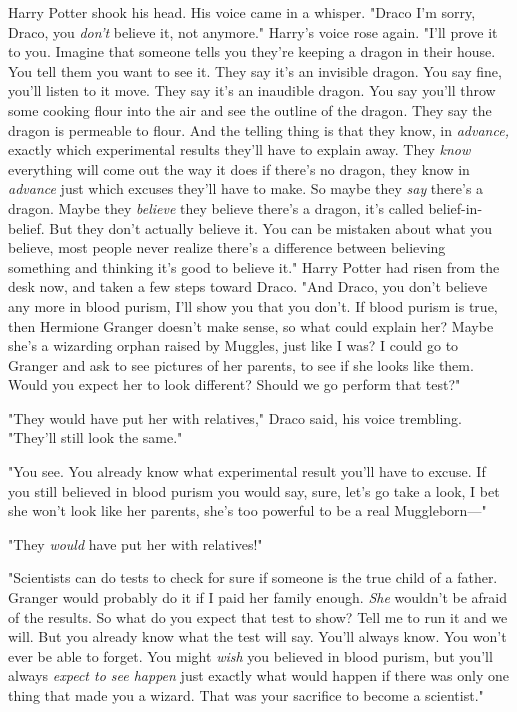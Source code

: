 Harry Potter shook his head. His voice came in a whisper. "Draco{\el} I'm
sorry, Draco, you \emph{don't} believe it, not anymore." Harry's voice rose
again. "I'll prove it to you. Imagine that someone tells you they're keeping a
dragon in their house. You tell them you want to see it. They say it's an
invisible dragon. You say fine, you'll listen to it move. They say it's an
inaudible dragon. You say you'll throw some cooking flour into the air and see
the outline of the dragon. They say the dragon is permeable to flour. And the
telling thing is that they know, in \emph{advance,} exactly which experimental
results they'll have to explain away. They \emph{know} everything will come out
the way it does if there's no dragon, they know in \emph{advance} just which
excuses they'll have to make. So maybe they \emph{say} there's a dragon. Maybe
they \emph{believe} they believe there's a dragon, it's called
belief-in-belief. But they don't actually believe it. You can be mistaken about
what you believe, most people never realize there's a difference between
believing something and thinking it's good to believe it." Harry Potter had
risen from the desk now, and taken a few steps toward Draco. "And Draco, you
don't believe any more in blood purism, I'll show you that you don't. If blood
purism is true, then Hermione Granger doesn't make sense, so what could explain
her? Maybe she's a wizarding orphan raised by Muggles, just like I was? I could
go to Granger and ask to see pictures of her parents, to see if she looks like
them. Would you expect her to look different? Should we go perform that test?"

"They would have put her with relatives," Draco said, his voice trembling.
"They'll still look the same."

"You see. You already know what experimental result you'll have to excuse. If
you still believed in blood purism you would say, sure, let's go take a look, I
bet she won't look like her parents, she's too powerful to be a real
Muggleborn\mbox{---}"

"They \emph{would} have put her with relatives!"

"Scientists can do tests to check for sure if someone is the true child of a
father. Granger would probably do it if I paid her family enough. \emph{She}
wouldn't be afraid of the results. So what do you expect that test to show?
Tell me to run it and we will. But you already know what the test will say.
You'll always know. You won't ever be able to forget. You might \emph{wish} you
believed in blood purism, but you'll always \emph{expect to see happen} just
exactly what would happen if there was only one thing that made you a wizard.
That was your sacrifice to become a scientist."

